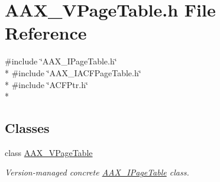 \hypertarget{a00312}{}\section{A\+A\+X\+\_\+\+V\+Page\+Table.\+h File Reference}
\label{a00312}
{\ttfamily \#include \char`\"{}A\+A\+X\+\_\+\+I\+Page\+Table.\+h\char`\"{}}\\*
{\ttfamily \#include \char`\"{}A\+A\+X\+\_\+\+I\+A\+C\+F\+Page\+Table.\+h\char`\"{}}\\*
{\ttfamily \#include \char`\"{}A\+C\+F\+Ptr.\+h\char`\"{}}\\*
\subsection*{Classes}
\begin{DoxyCompactItemize}
\item 
class \hyperlink{a00138}{A\+A\+X\+\_\+\+V\+Page\+Table}
\begin{DoxyCompactList}\small\item\em Version-\/managed concrete \hyperlink{a00107}{A\+A\+X\+\_\+\+I\+Page\+Table} class. \end{DoxyCompactList}\end{DoxyCompactItemize}
